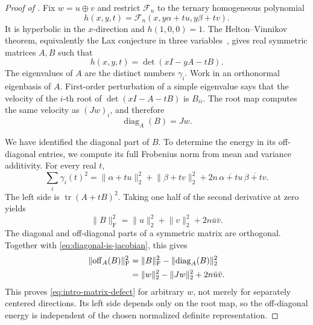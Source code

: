 \documentclass[12pt,reqno]{amsart}
\theoremstyle{definition}
\theoremstyle{remark}
\begin{document}
\begin{proof}[Proof of ]
Fix \(w=u\oplus v\) and restrict \(\mathcal F_n\) to the ternary
homogeneous polynomial
\begin{equation}\label{eq:ternary-restriction}
 h(x,y,t)=\mathcal F_n(x,y\alpha+tu,y\beta+tv).
\end{equation}
It is hyperbolic in the \(x\)-direction and \(h(1,0,0)=1\).  The
Helton--Vinnikov theorem, equivalently the Lax conjecture in three
variables~\cite{HeltonVinnikov07,LewisParriloRamana05}, gives real
symmetric matrices \(A,B\) such that
\begin{equation}\label{eq:determinantal-pencil}
 h(x,y,t)=\det(xI-yA-tB).
\end{equation}
The eigenvalues of \(A\) are the distinct numbers \(\gamma_i\).  Work in an
orthonormal eigenbasis of \(A\).  First-order perturbation of a simple
eigenvalue says that the velocity of the \(i\)-th root of
\(\det(xI-A-tB)\) is \(B_{ii}\).  The root map computes the same velocity
as \((Jw)_i\), and therefore
\begin{equation}\label{eq:diagonal-is-jacobian}
 \operatorname{diag}_A(B)=Jw.
\end{equation}

We have identified the diagonal part of \(B\). To determine the energy in its off-diagonal entries, we compute its full Frobenius norm from mean and variance additivity. For every real \(t\),
\begin{equation}\label{eq:second-moment-identity}
 \sum_i\gamma_i(t)^2
 =\lVert\alpha+tu\rVert_2^2+\lVert\beta+tv\rVert_2^2
   +2n\,\overline{\alpha+tu}\,\overline{\beta+tv}.
\end{equation}
The left side is \(\operatorname{tr}(A+tB)^2\).  Taking one half of the
second derivative at zero yields
\begin{equation}\label{eq:pencil-frobenius-norm}
 \lVert B\rVert_{\mathrm F}^2
 =\lVert u\rVert_2^2+\lVert v\rVert_2^2+2n\bar u\bar v.
\end{equation}
The diagonal and off-diagonal parts of a symmetric matrix are orthogonal.
Together with \eqref{eq:diagonal-is-jacobian}, this gives
\begin{align}\label{eq:sum-of-squares}
 \lVert\operatorname{off}_A(B)\rVert_{\mathrm F}^2
 &=\lVert B\rVert_{\mathrm F}^2
   -\lVert\operatorname{diag}_A(B)\rVert_2^2\notag\\
 &=\lVert w\rVert_2^2-\lVert Jw\rVert_2^2+2n\bar u\bar v.
\end{align}
This proves \eqref{eq:intro-matrix-defect} for arbitrary \(w\), not merely
for separately centered directions.  Its left side depends only on the root
map, so the off-diagonal energy is independent of the chosen normalized
definite representation.


\end{proof}
\end{document}
